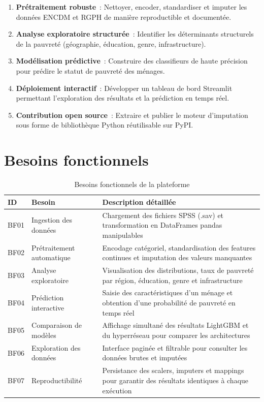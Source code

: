 \documentclass[12pt,a4paper]{report}
\begin{document}
\begin{enumerate}
  \item \textbf{Prétraitement robuste}~: Nettoyer, encoder, standardiser et imputer les données ENCDM et RGPH de manière reproductible et documentée.
  \item \textbf{Analyse exploratoire structurée}~: Identifier les déterminants structurels de la pauvreté (géographie, éducation, genre, infrastructure).
  \item \textbf{Modélisation prédictive}~: Construire des classifieurs de haute précision pour prédire le statut de pauvreté des ménages.
  \item \textbf{Déploiement interactif}~: Développer un tableau de bord Streamlit permettant l'exploration des résultats et la prédiction en temps réel.
  \item \textbf{Contribution open source}~: Extraire et publier le moteur d'imputation sous forme de bibliothèque Python réutilisable sur PyPI.
\end{enumerate}

\section{Besoins fonctionnels}

\begin{table}[H]
\centering
\caption{Besoins fonctionnels de la plateforme}
\label{tab:besoins_fonc}
\begin{tabularx}{\textwidth}{C{1.2cm}L{4.2cm}X}
\toprule
\textbf{ID} & \textbf{Besoin} & \textbf{Description détaillée} \\
\midrule
BF01 & Ingestion des données & Chargement des fichiers SPSS (.sav) et transformation en DataFrames pandas manipulables \\
BF02 & Prétraitement automatique & Encodage catégoriel, standardisation des features continues et imputation des valeurs manquantes \\
BF03 & Analyse exploratoire & Visualisation des distributions, taux de pauvreté par région, éducation, genre et infrastructure \\
BF04 & Prédiction interactive & Saisie des caractéristiques d'un ménage et obtention d'une probabilité de pauvreté en temps réel \\
BF05 & Comparaison de modèles & Affichage simultané des résultats LightGBM et du hyperréseau pour comparer les architectures \\
BF06 & Exploration des données & Interface paginée et filtrable pour consulter les données brutes et imputées \\
BF07 & Reproductibilité & Persistance des scalers, imputers et mappings pour garantir des résultats identiques à chaque exécution \\
\bottomrule
\end{tabularx}
\end{table}
\end{document}
